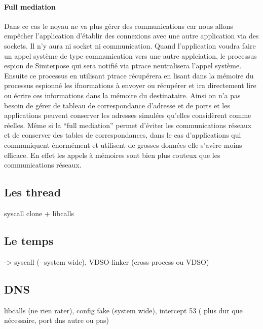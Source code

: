 \paragraph{Full mediation} 
Dans ce cas le noyau ne va plus gérer des communications car nous allons
empêcher l'application d'établir des connexions avec une autre application via
des sockets. Il n'y aura ni socket ni communication. Quand l'application voudra
faire un appel système de type communication vers une autre applciation, le
processus espion de Simterpose qui sera notifié via ptrace neutralisera l'appel
système. Ensuite ce processus en utilisant ptrace récupérera en lisant dans la
mémoire du processus espionné les ifnormations à envoyer ou récupérer et ira
directement lire ou écrire ces informations dans la mémoire du
destinataire. Ainsi on n'a pas besoin de gérer de tableau de correspondance
d'adresse et de ports et les applications peuvent conserver les adresses
simulées qu'elles considèrent comme réelles.  Même si la ``full mediation''
permet d'éviter les communications réseaux et de conserver des tables de
correspondances, dans le cas d'applications qui communiquent énormément et
utilisent de grosses données elle s'avère moins efficace. En effet les appels à
mémoires sont bien plus couteux que les communications réseaux.

\subsection{Les thread}
 syscall clone + libcalls

\subsection{Le temps}
 -> syscall (- system wide), VDSO-linker (cross process ou VDSO)

\subsection{DNS}
libcalls (ne rien rater), config fake (system wide), intercept 53 ( plus dur que nécessaire, port dns autre ou pas)
